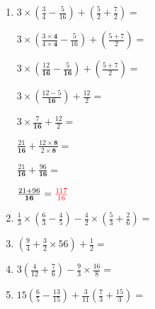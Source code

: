 \documentclass[11pt]{examdesign}
\theoremstyle{plain}
\theoremstyle{definition}
\theoremstyle{remark}
\begin{document}
\begin{shortanswer}[title={\textit{Operaciones con fracciones.}},
    	rearrange=no,resetcounter=yes]
\begin{question}
\begin{answer}
\begin{enumerate}
    				      $\left(\frac{-30}{\textbf{6}}\right)+\frac{1\times\textbf{3}}{2\times\textbf{3}}=$
    				      
    				      $\left(\frac{-30}{\textbf{6}}\right)+\frac{3}{\textbf{6}}=$
    				      
    				      $\left(\frac{-30+3}{\textbf{6}}\right)=\textcolor{red}{\frac{-27}{\textbf{6}}}$
    				\item $3\times\left(\frac{3}{4}-\frac{5}{16}\right)+\left(\frac{5}{2}+\frac{7}{2}\right)=$
    				
    				$3\times\left(\frac{3\times\textbf{4}}{4\times\textbf{4}}-\frac{5}{16}\right)+\left(\frac{5+7}{2}\right)=$
    				
    				$3\times\left(\frac{12}{\textbf{16}}-\frac{5}{\textbf{16}}\right)+\left(\frac{5+7}{2}\right)=$
    				
    				$3\times\left(\frac{12-5}{\textbf{16}}\right)+\frac{12}{2}=$
    				
    				$3\times\frac{7}{\textbf{16}}+\frac{12}{2}=$
    				
    				$\frac{21}{\textbf{16}}+\frac{12\times\textbf{8}}{2\times\textbf{8}}=$
    				
    				$\frac{21}{\textbf{16}}+\frac{96}{\textbf{16}}=$
    				
    				$\frac{21+96}{\textbf{16}}=\textcolor{red}{\frac{117}{16}} $
    				
    				\item $\frac{1}{3}\times\left(\frac{6}{3}-\frac{4}{5}\right)-\frac{4}{2}\times\left(\frac{5}{3}+\frac{2}{6}\right)=$
    				
    				\item $\left(\frac{9}{4}+\frac{3}{2}\times{5}{6}\right)+\frac{1}{2}=$
    				
    				\item $3\left(\frac{4}{12}+\frac{7}{6}\right)-\frac{9}{3}\times\frac{16}{8}=$
    				
    				\item $15\left(\frac{6}{5}-\frac{13}{15}\right)+\frac{3}{11}\left(\frac{7}{3}+\frac{15}{3}\right)=$
    			\end{enumerate}
    		\end{answer}
    	\end{question}
    	
    \end{shortanswer}
\end{document}
